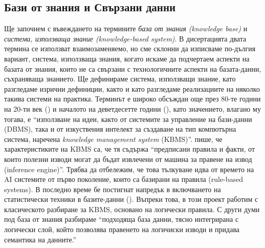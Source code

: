\subsection*{Бази от знания и  Свързани данни}
Ще започнем с въвеждането на термините \emph{база от знания (knowledge base)} и \emph {система, използваща знание (knowledge-based system)}. В дисертацията двата термина се използват взаимозаменяемо, но сме склонни да изписваме по-дългия вариант, система, използваща знания, когато искаме да подчертаем аспекти на базата от знания, които не са свързани с технологичните аспекти на базата-данни, съхраняваща знанието. Ще дефинираме система, използващи знание, като разгледаме изрични дефиниции, както и като разгледаме реализациите на няколко такива системи на практика. Терминът е широко обсъждан още през 80-те години на 20-ти век (\cite{brodie_kbms_1989}) и началото на деветдесетте години (\cite{harris_knowledge_1993}), като значението, влагано му тогава, е ``използване на идеи, както от системите за управление на бази-данни (DBMS), така и от изкуствения интелект за създаване на тип компютърна система, наречена \emph {knowledge management system} (KBMS)''. \cite{harris_knowledge_1993} пише, че характеристиките на KBMS са, че тя съдържа ``предписани правила и факти, от които полезни изводи могат да бъдат извлечени от машина за правене на извод (inference engine)''. Трябва да отбележим, че това тълкуване идва от времето на AI системите от първо поколение, които са базирани на правила (rule-based systems). В последно време бе постигнат напредък в включването на статистически техники в базите-данни (\cite {mansinghka_bayesdb:_2015}). Въпреки това, в този проект работим с класическото разбиране за KBMS, основано на логически правила. С други думи под база от знания разбираме ``подходяща база данни, тясно интегрирана с логически слой, който позволява правенето на логичиски изводи и придава семантика на данните.''

